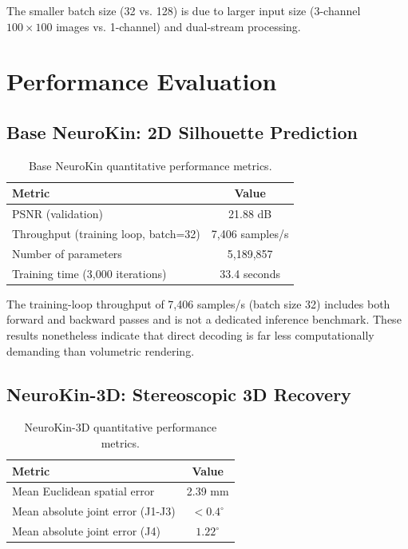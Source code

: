 \documentclass[12pt,a4paper,oneside]{report}
\begin{document}
The smaller batch size (32 vs. 128) is due to larger input size (3-channel $100 \times 100$ images vs. 1-channel) and dual-stream processing.

\section{Performance Evaluation}

\subsection{Base NeuroKin: 2D Silhouette Prediction}

\begin{table}[H]
\centering
\caption{Base NeuroKin quantitative performance metrics.}
\label{tab:neurokin_performance}
\begin{tabular}{lc}
\toprule
Metric & Value \\
\midrule
PSNR (validation) & 21.88 dB \\
Throughput (training loop, batch=32) & 7,406 samples/s \\
Number of parameters & 5,189,857 \\
Training time (3,000 iterations) & 33.4 seconds \\
\bottomrule
\end{tabular}
\end{table}

The training-loop throughput of 7,406 samples/s (batch size 32) includes both forward and backward passes and is not a dedicated inference benchmark. These results nonetheless indicate that direct decoding is far less computationally demanding than volumetric rendering.

\subsection{NeuroKin-3D: Stereoscopic 3D Recovery}

\begin{table}[H]
\centering
\caption{NeuroKin-3D quantitative performance metrics.}
\label{tab:neurokin3d_performance}
\begin{tabular}{lc}
\toprule
Metric & Value \\
\midrule
Mean Euclidean spatial error & 2.39 mm \\
Mean absolute joint error (J1-J3) & $<0.4^\circ$ \\
Mean absolute joint error (J4) & $1.22^\circ$ \\
\bottomrule
\end{tabular}
\end{table}
\end{document}
